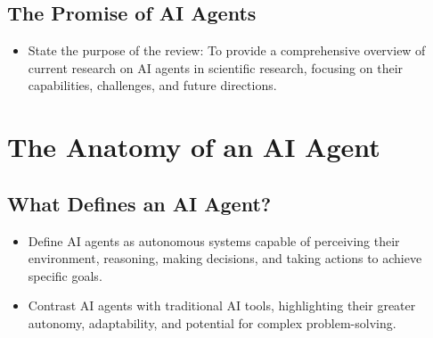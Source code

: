 \documentclass{article}
\begin{document}
\subsection{The Promise of AI Agents}
\begin{itemize}
    \item State the purpose of the review: To provide a comprehensive overview of current research on AI agents in scientific research, focusing on their capabilities, challenges, and future directions.
\end{itemize}

\section{The Anatomy of an AI Agent}

\subsection{What Defines an AI Agent?}
\begin{itemize}
    \item Define AI agents as autonomous systems capable of perceiving their environment, reasoning, making decisions, and taking actions to achieve specific goals.
    \item Contrast AI agents with traditional AI tools, highlighting their greater autonomy, adaptability, and potential for complex problem-solving.
\end{itemize}
\end{document}
